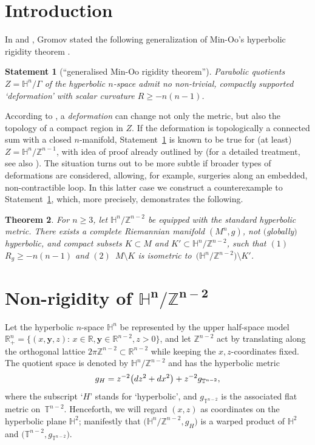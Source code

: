 \documentclass[11pt]{article}
\numberwithin{equation}{section}
\numberwithin{equation}{section}
\newtheorem{Theorem}{Theorem}[section]
\newtheorem{State}[Theorem]{Statement}
\def\R{\mathbb{R}}
\def\H{\mathbb{H}}
\def\T{\mathbb{T}}
\def\Z{\mathbb{Z}}
\def\ed{{\rm d}}
\begin{document}
\section{Introduction}

In \cite[Section 3]{Gr2019} and \cite[p.~240]{Gr2021}, Gromov stated the following generalization
of Min-Oo's hyperbolic rigidity theorem \cite{MinOo89}.

\begin{State}[``generalised Min-Oo rigidity theorem'']\label{generminoo}
Parabolic quotients $Z=\mathbb{H}^n/\Gamma$ of the hyperbolic $n$-space admit no non-trivial, compactly supported `deformation' with scalar curvature $R\geq -n(n-1)$.
\end{State}
According to \cite{Gr2019}, a \emph{deformation} can change not only the metric, but also the topology of a compact region in $Z$.
If the deformation is topologically a connected sum with
a closed $n$-manifold,
Statement~\ref{generminoo} is known to be true for (at least) $Z = \H^n/\Z^{n-1}$,
with idea of proof already outlined by \cite[Section $5\frac{5}{6}$]{Gr93} (for a detailed treatment, see
also  \cite[Theorem 1.1]{ACG08}).
The situation
turns out to be more subtle
if broader types of deformations are considered, allowing, for example, surgeries along
an embedded, non-contractible loop.
In this latter case we construct a counterexample to Statement~\ref{generminoo}, which, more precisely,
demonstrates the following.

\begin{Theorem}\label{counterexample}
For $n\ge 3$, let $\mathbb{H}^n/\mathbb{Z}^{n-2}$ be equipped with the standard hyperbolic metric.
There exists a complete Riemannian manifold $(M^n,g)$, not $($globally$)$ hyperbolic, and
compact subsets $K\subset M$ and $K'\subset\H^n/\Z^{n-2}$, such that $(1)$~$R_g\ge -n(n-1)$ and $(2)$~$M\setminus K$ is isometric to~$\big(\mathbb{H}^n/\mathbb{Z}^{n-2}\big)\setminus K'$.	
\end{Theorem}


\section[Non-rigidity of H\^{}n/Z\^{}(n-2)]{Non-rigidity of $\boldsymbol{\H^n/\Z^{n-2}}$}\label{Non-rigidity}

Let the hyperbolic $n$-space $\H^n$ be represented by the upper half-space model
$\R^n_+ = \{(x,\boldsymbol{y},z)$: $x\in \R, \boldsymbol{y}\in \R^{n-2}, z>0\}$,
and let $\Z^{n-2}$ act by translating along the orthogonal lattice $2\pi \Z^{n-2}\subset \R^{n-2}$
while keeping the $x,z$-coordinates fixed. The quotient space is denoted by
$\H^{n}/\Z^{n-2}$ and has the hyperbolic metric
\begin{equation}\label{gHdef}
	g_{H} = z^{-2}\bigl(\ed z^2 + \ed x^2\bigr) + z^{-2} g_{\T^{n-2}},
\end{equation}
where the subscript `$H$' stands for `hyperbolic', and $g_{\T^{n-2}}$ is the associated flat metric on~$\T^{n-2}$.
Henceforth, we will regard $(x,z)$ as coordinates on the hyperbolic plane $\H^2$;
manifestly that $\big(\H^{n}/\Z^{n-2},g_H\big)$ is a warped product of $\H^2$ and $\big(\T^{n-2}, g_{\T^{n-2}}\big)$.
\end{document}
